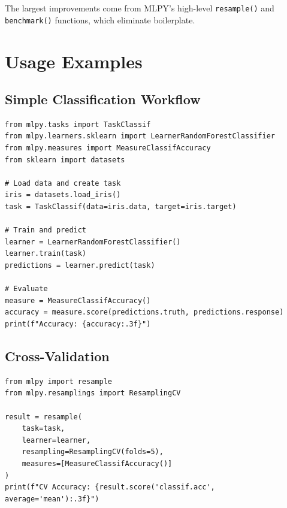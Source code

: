 \documentclass[twoside,11pt]{article}
\begin{document}
The largest improvements come from MLPY's high-level \texttt{resample()} and
\texttt{benchmark()} functions, which eliminate boilerplate.





\section{Usage Examples}
\label{sec:examples}

\subsection{Simple Classification Workflow}

\begin{lstlisting}
from mlpy.tasks import TaskClassif
from mlpy.learners.sklearn import LearnerRandomForestClassifier
from mlpy.measures import MeasureClassifAccuracy
from sklearn import datasets

# Load data and create task
iris = datasets.load_iris()
task = TaskClassif(data=iris.data, target=iris.target)

# Train and predict
learner = LearnerRandomForestClassifier()
learner.train(task)
predictions = learner.predict(task)

# Evaluate
measure = MeasureClassifAccuracy()
accuracy = measure.score(predictions.truth, predictions.response)
print(f"Accuracy: {accuracy:.3f}")
\end{lstlisting}

\subsection{Cross-Validation}

\begin{lstlisting}
from mlpy import resample
from mlpy.resamplings import ResamplingCV

result = resample(
    task=task,
    learner=learner,
    resampling=ResamplingCV(folds=5),
    measures=[MeasureClassifAccuracy()]
)
print(f"CV Accuracy: {result.score('classif.acc', average='mean'):.3f}")
\end{lstlisting}
\end{document}
